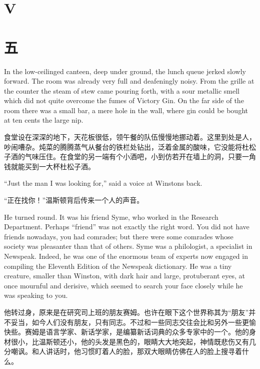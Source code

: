 \begin{paracol}{2}
\section{V}\label{v}

\switchcolumn

\section*{五}\label{ux4e94}

\switchcolumn*

In the low-ceilinged canteen, deep under ground, the lunch queue jerked
slowly forward. The room was already very full and deafeningly noisy.
From the grille at the counter the steam of stew came pouring forth,
with a sour metallic smell which did not quite overcome the fumes of
Victory Gin. On the far side of the room there was a small bar, a mere
hole in the wall, where gin could be bought at ten cents the large nip.

\switchcolumn

食堂设在深深的地下，天花板很低，领午餐的队伍慢慢地挪动着。这里到处是人，吵闹嘈杂。炖菜的腾腾蒸气从餐台的铁栏处钻出，泛着金属的酸味，它没能将杜松子酒的气味压住。在食堂的另一端有个小酒吧，小到仿若开在墙上的洞，只要一角钱就能买到一大杯杜松子酒。

\switchcolumn*

``Just the man I was looking for,'' said a voice at
Winston\textquotesingle s back.

\switchcolumn

``正在找你！''温斯顿背后传来一个人的声音。

\switchcolumn*

He turned round. It was his friend Syme, who worked in the Research
Department. Perhaps ``friend'' was not exactly the right word. You did not
have friends nowadays, you had comrades; but there were some comrades
whose society was pleasanter than that of others. Syme was a
philologist, a specialist in Newspeak. Indeed, he was one of the
enormous team of experts now engaged in compiling the Eleventh Edition
of the Newspeak dictionary. He was a tiny creature, smaller than
Winston, with dark hair and large, protuberant eyes, at once mournful
and derisive, which seemed to search your face closely while he was
speaking to you.

\switchcolumn

他转过身，原来是在研究司上班的朋友赛姆。也许在眼下这个世界称其为``朋友''并不妥当，如今人们没有朋友，只有同志。不过和一些同志交往会比和另外一些更愉快些。赛姆是语言学家、新话学家，是编纂新话词典的众多专家中的一个。他的身材很小，比温斯顿还小，他的头发是黑色的，眼睛大大地突起，神情既悲伤又有几分嘲讽。和人讲话时，他习惯盯着人的脸，那双大眼睛仿佛在人的脸上搜寻着什么。


\end{paracol}
